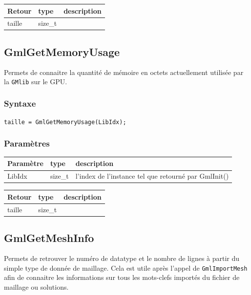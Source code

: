 \documentclass[a4paper,12pt]{article}
\begin{document}
\medskip

\begin{tabular}{|m{2cm}|m{1.5cm}|m{10.5cm}|}
\hline
Retour     & type    & description \\
\hline
taille     & size\_t & \\
\hline
\end{tabular}


\subsection{GmlGetMemoryUsage}

Permets de connaitre la quantité de mémoire en octets actuellement utilisée par la {\tt GMlib} sur le GPU.

\subsubsection*{Syntaxe}

{\tt taille = GmlGetMemoryUsage(LibIdx);}

\subsubsection*{Paramètres}

\begin{tabular}{|m{2cm}|m{1.5cm}|m{10.5cm}|}
\hline
Paramètre  & type    & description \\
\hline
LibIdx     & size\_t & l'index de l'instance tel que retourné par GmlInit() \\
\hline
\end{tabular}

\medskip

\begin{tabular}{|m{2cm}|m{1.5cm}|m{10.5cm}|}
\hline
Retour     & type    & description \\
\hline
taille     & size\_t & \\
\hline
\end{tabular}


\subsection{GmlGetMeshInfo}

Permets de retrouver le numéro de datatype et le nombre de lignes à partir du simple type de donnée de maillage.
Cela est utile après l'appel de {\tt GmlImportMesh} afin de connaitre les informations sur tous les mots-clefs importés du fichier de maillage ou solutions.
\end{document}
